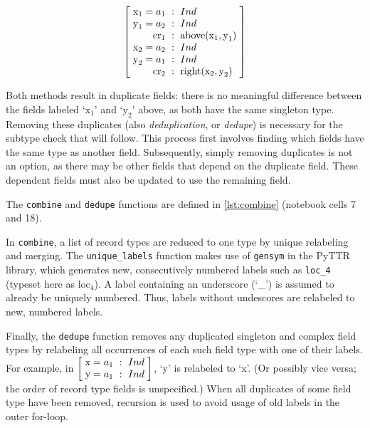 \begin{equation} \label{eq:combineunconflict}
\rec{
    \text{x}_1=a_1 &:& Ind \\
    \text{y}_1=a_2 &:& Ind \\
    \text{cr}_1 &:& \text{above}(\text{x}_1, \text{y}_1) \\
    \text{x}_2=a_2 &:& Ind \\
    \text{y}_2=a_1 &:& Ind \\
    \text{cr}_2 &:& \text{right}(\text{x}_2, \text{y}_2)
    }
\end{equation}

Both methods result in duplicate fields: there is no meaningful difference between the fields labeled `$\text{x}_1$' and `$\text{y}_2$' above, as both have the same singleton type.
Removing these duplicates (also \textit{deduplication}, or \textit{dedupe}) is necessary for the subtype check that will follow.
This process first involves finding which fields have the same type as another field.
Subsequently, simply removing duplicates is not an option, as there may be other fields that depend on the duplicate field.
These dependent fields must also be updated to use the remaining field.

The \texttt{combine} and \texttt{dedupe} functions are defined in \autoref{lst:combine} (notebook cells 7 and 18).

In \texttt{combine}, a list of record types are reduced to one type by unique relabeling and merging.
The \texttt{unique\_labels} function makes use of \texttt{gensym} in the PyTTR library, which generates new, consecutively numbered labels such as \texttt{loc\_4} (typeset here as $\text{loc}_4$).
A label containing an underscore (`\_') is assumed to already be uniquely numbered.
Thus, labels without undescores are relabeled to new, numbered labels.

Finally, the \texttt{dedupe} function removes any duplicated singleton and complex field types by relabeling all occurrences of each such field type with one of their labels.
For example, in $\rec{\text{x}=a_1 &:& Ind \\ \text{y}=a_1 &:& Ind}$, `y' is relabeled to `x'.
(Or possibly vice versa; the order of record type fields is unspecified.)
When all duplicates of some field type have been removed, recursion is used to avoid usage of old labels in the outer for-loop.


